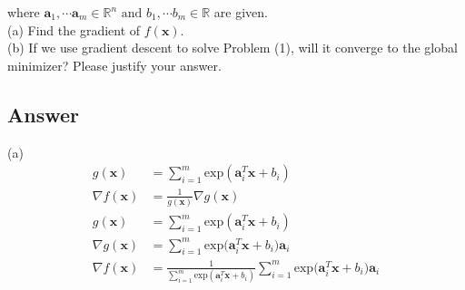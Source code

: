 \documentclass[a4paper,12pt]{article}
\newcommand{\R}{\mathbb{R}}
\begin{document}
where \(\bm{a}_1, \cdots \bm{a}_m \in \R^n \text{ and } b_1, \cdots b_m \in \R\) are given. \\

(a) Find the gradient of \(f(\bm{x})\). \\
(b) If we use gradient descent to solve Problem (1), will it converge to the global minimizer? Please justify your answer.


\subsection*{Answer}
(a) 
\begin{align*}
    g(\bm{x}) &= \sum_{i=1}^m \text{exp}(\bm{a}_i^T\bm{x} + b_i) \\
    \nabla f(\bm{x}) &= \frac{1}{g(\bm{x})}\nabla g(\bm{x}) \\
    g(\bm{x}) &= \sum_{i = 1}^m \text{exp}(\bm{a}_i^T\bm{x} + b_i) \\
    \nabla g(\bm{x}) &= \sum_{i = 1}^m \text{exp(}\bm{a}_i^T\bm{x} + b_i)\bm{a}_i \\
    \nabla f(\bm{x}) &= \frac{1}{\sum_{i=1}^m \text{exp}(\bm{a}_i^T\bm{x} + b_i)} \sum_{i = 1}^m \text{exp(}\bm{a}_i^T\bm{x} + b_i)\bm{a}_i 
\end{align*}
\end{document}
